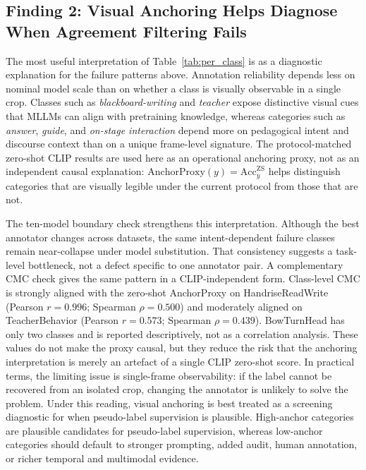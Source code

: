 \documentclass{ieeeaccess}
\begin{document}
\subsection{Finding 2: Visual Anchoring Helps Diagnose When Agreement
Filtering Fails}

The most useful interpretation of Table~\ref{tab:per_class} is as a
diagnostic explanation for the failure patterns above.
Annotation reliability depends less on nominal model scale than on
whether a class is visually observable in a single crop.
Classes such as \textit{blackboard-writing} and \textit{teacher}
expose distinctive visual cues that MLLMs can align with pretraining
knowledge, whereas categories such as \textit{answer}, \textit{guide},
and \textit{on-stage interaction} depend more on pedagogical intent and
discourse context than on a unique frame-level signature.
The protocol-matched zero-shot CLIP results are used here as
an operational anchoring proxy, not as an independent causal
explanation: $\mathrm{AnchorProxy}(y)=\mathrm{Acc}^{\mathrm{ZS}}_{y}$
helps distinguish categories that are visually legible under the
current protocol from those that are not.

The ten-model boundary check strengthens this interpretation.
Although the best annotator changes across datasets, the same
intent-dependent failure classes remain near-collapse under model
substitution.
That consistency suggests a task-level bottleneck, not a defect
specific to one annotator pair.
A complementary CMC check gives the same pattern in a CLIP-independent
form. Class-level CMC is strongly aligned with the zero-shot
AnchorProxy on HandriseReadWrite (Pearson $r=0.996$; Spearman
$\rho=0.500$) and moderately aligned on TeacherBehavior (Pearson
$r=0.573$; Spearman $\rho=0.439$). BowTurnHead has only two classes and
is reported descriptively, not as a correlation
analysis. These values do not make the proxy causal, but they reduce
the risk that the anchoring interpretation is merely an artefact of a
single CLIP zero-shot score.
In practical terms, the limiting issue is single-frame observability:
if the label cannot be recovered from an isolated crop, changing the
annotator is unlikely to solve the problem.
Under this reading, visual anchoring is best treated as a screening
diagnostic for when pseudo-label supervision is plausible.
High-anchor categories are plausible candidates for pseudo-label
supervision, whereas low-anchor categories should default to stronger
prompting, added audit, human annotation, or richer temporal and
multimodal evidence.
\end{document}
